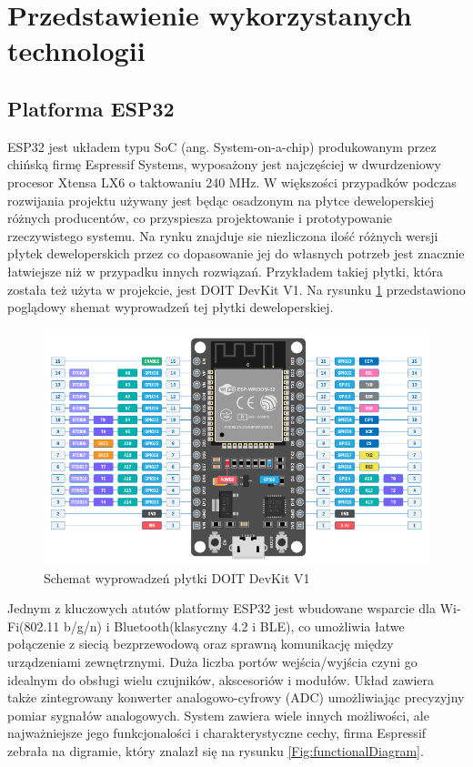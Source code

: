 \documentclass[12pt,twoside,draft]{article}
\begin{document}
\section{Przedstawienie wykorzystanych technologii}
\subsection{Platforma ESP32}
ESP32 jest układem typu SoC (ang. System-on-a-chip) produkowanym przez chińską firmę Espressif Systems,
wyposażony jest najczęściej w dwurdzeniowy procesor Xtensa LX6 o taktowaniu 240 MHz\cite{esp32Datasheet}. W większości przypadków podczas rozwijania projektu używany jest będąc osadzonym na płytce deweloperskiej różnych producentów, co przyspiesza projektowanie i prototypowanie rzeczywistego systemu. Na rynku znajduje sie niezliczona ilość różnych wersji płytek deweloperskich przez co dopasowanie
jej do własnych potrzeb jest znacznie łatwiejsze niż w przypadku innych rozwiązań. Przykładem takiej płytki, która została też użyta w projekcie, jest DOIT DevKit V1\cite{doitDevKitV1}. Na rysunku \ref*{Fig:devkitScheme} przedstawiono poglądowy shemat wyprowadzeń tej płytki deweloperskiej.

\begin{figure}[ht]
   \centering
   \includegraphics[width=13cm]{images/doit_devkit_v1.png}
   \caption{Schemat wyprowadzeń płytki DOIT DevKit V1 \cite{doitDevKitV1}}
   \label{Fig:devkitScheme}
\end{figure}

Jednym z kluczowych atutów platformy ESP32 jest wbudowane wsparcie dla Wi-Fi(802.11 b/g/n) i Bluetooth(klasyczny 4.2 i BLE), co umożliwia łatwe połączenie z siecią bezprzewodową oraz sprawną komunikację między urządzeniami zewnętrznymi.
Duża licz\-ba portów wejścia/wyjścia czyni go idealnym do obsługi wielu czujników, akscesoriów i modułów. Układ zawiera także zintegrowany konwerter analogowo-cyfrowy (ADC) umożliwiając precyzyjny pomiar sygnałów analogowych. System zawiera wiele innych możliwości, ale najważniejsze jego funkcjonalości i charakterystyczne cechy, firma Espressif zebrała na digramie,  który znalazł się na rysunku \ref*{Fig:functionalDiagram}.
\end{document}
